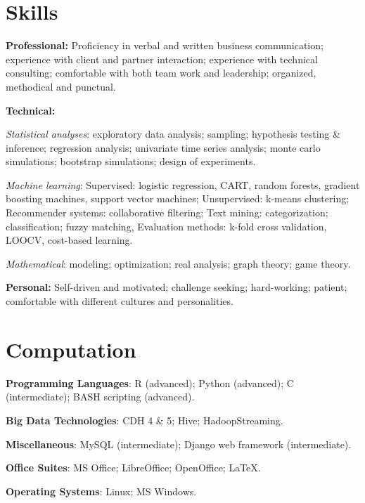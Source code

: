 \documentclass[a4paper,10pt]{article}
\renewenvironment{itemize}{
\begin{list}{}{
  \setlength{\leftmargin}{1.5em}
  }
  }{
\end{list}
}
\begin{document}
\section*{Skills}
\begin{itemize}
  \item \textbf{Professional:}
    Proficiency in verbal and written business communication; experience with
    client and partner interaction; experience with technical consulting;
    comfortable with both team work and leadership; organized, methodical and
    punctual.
  \item \textbf{Technical:}
    \begin{itemize}
      \item \emph{Statistical analyses}: exploratory data analysis; sampling;
        hypothesis testing \& inference; regression analysis; univariate time
        series analysis; monte carlo simulations; bootstrap simulations; design
        of experiments.
      \item \emph{Machine learning}: Supervised: logistic regression, CART,
        random forests, gradient boosting machines, support vector machines;
        Unsupervised: k-means clustering; Recommender systems: collaborative
        filtering; Text mining: categorization; classification; fuzzy matching,
        Evaluation methods: k-fold cross validation, LOOCV, cost-based
        learning.
      \item \emph{Mathematical}: modeling; optimization; real analysis; graph
        theory; game theory.
    \end{itemize}
  \item \textbf{Personal:}
    Self-driven and motivated; challenge seeking; hard-working; patient;
    comfortable with different cultures and personalities.
\end{itemize}

\section*{Computation}
\begin{itemize}
  \item \textbf{Programming Languages}: R (advanced); Python (advanced); C
    (intermediate); BASH scripting (advanced).
  \item \textbf{Big Data Technologies}: CDH 4 \& 5; Hive; HadoopStreaming.
  \item \textbf{Miscellaneous}: MySQL (intermediate); Django web framework
    (intermediate).
  \item \textbf{Office Suites}: MS Office; LibreOffice; OpenOffice; \LaTeX{}.
  \item \textbf{Operating Systems}: Linux; MS Windows.
\end{itemize}
\end{document}
